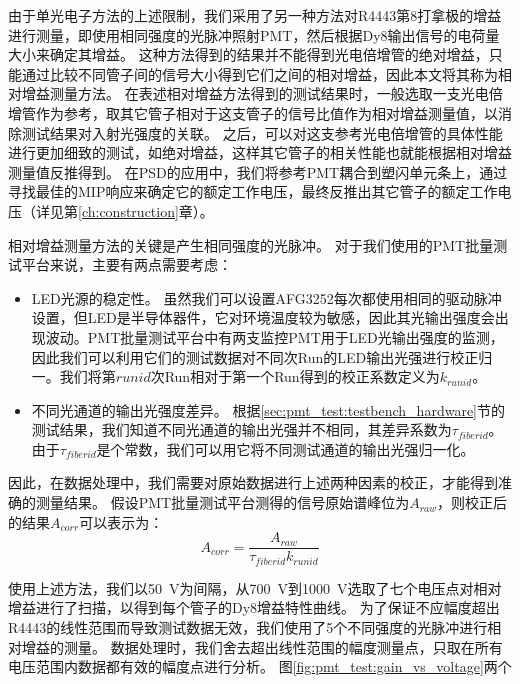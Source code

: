由于单光电子方法的上述限制，我们采用了另一种方法对R4443第8打拿极的增益进行测量，即使用相同强度的光脉冲照射PMT，然后根据Dy8输出信号的电荷量大小来确定其增益。
这种方法得到的结果并不能得到光电倍增管的绝对增益，只能通过比较不同管子间的信号大小得到它们之间的相对增益，因此本文将其称为相对增益测量方法。
在表述相对增益方法得到的测试结果时，一般选取一支光电倍增管作为参考，取其它管子相对于这支管子的信号比值作为相对增益测量值，以消除测试结果对入射光强度的关联。
之后，可以对这支参考光电倍增管的具体性能进行更加细致的测试，如绝对增益，这样其它管子的相关性能也就能根据相对增益测量值反推得到。
在PSD的应用中，我们将参考PMT耦合到塑闪单元条上，通过寻找最佳的MIP响应来确定它的额定工作电压，最终反推出其它管子的额定工作电压（详见第\ref{ch:construction}章）。

相对增益测量方法的关键是产生相同强度的光脉冲。
对于我们使用的PMT批量测试平台来说，主要有两点需要考虑：
\begin{itemize}
	\item LED光源的稳定性。 虽然我们可以设置AFG3252每次都使用相同的驱动脉冲设置，但LED是半导体器件，它对环境温度较为敏感，因此其光输出强度会出现波动。PMT批量测试平台中有两支监控PMT用于LED光输出强度的监测，因此我们可以利用它们的测试数据对不同次Run的LED输出光强进行校正归一。我们将第$runid$次Run相对于第一个Run得到的校正系数定义为$k_{runid}$。
	\item 不同光通道的输出光强度差异。 根据\ref{sec:pmt_test:testbench_hardware}节的测试结果，我们知道不同光通道的输出光强并不相同，其差异系数为$\tau_{fiberid}$。由于$\tau_{fiberid}$是个常数，我们可以用它将不同测试通道的输出光强归一化。
\end{itemize}
因此，在数据处理中，我们需要对原始数据进行上述两种因素的校正，才能得到准确的测量结果。
假设PMT批量测试平台测得的信号原始谱峰位为$A_{raw}$，则校正后的结果$A_{corr}$可以表示为：
\begin{equation}
	A_{corr} = \frac{A_{raw}}{\tau_{fiberid} k_{runid}}
	\label{eq:pmt_test:gain_correction}
\end{equation}

使用上述方法，我们以\SI{50}{V}为间隔，从\SI{700}{V}到\SI{1000}{V}选取了七个电压点对相对增益进行了扫描，以得到每个管子的Dy8增益特性曲线。
为了保证不应幅度超出R4443的线性范围而导致测试数据无效，我们使用了5个不同强度的光脉冲进行相对增益的测量。
数据处理时，我们舍去超出线性范围的幅度测量点，只取在所有电压范围内数据都有效的幅度点进行分析。
图\ref{fig:pmt_test:gain_vs_voltage}两个


